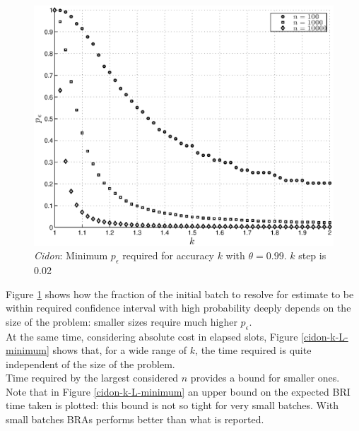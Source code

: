 \documentclass[12pt,a4paper]{report}
\newcommand{\pc}{p_{\epsilon}}
\begin{document}
\begin{figure}[htbp]
\begin{center}
\includegraphics[scale=0.7]{matlab/Cidon/cidon-k-p-minimum}
\caption[\emph{Cidon}: Minimum $\pc$ required for accuracy $k$]{\emph{Cidon}: Minimum $\pc$ required for accuracy $k$ with $\theta=0.99$. $k$ step is 0.02}
\label{cidon-k-p-minimum}
\end{center}
\end{figure}

Figure \ref{cidon-k-p-minimum} shows how the fraction of the initial batch to resolve for estimate to be within  required confidence interval with high probability deeply depends on the size of the problem: smaller sizes require much higher $\pc$.\\
At the same time, considering absolute cost in elapsed slots, Figure  \ref{cidon-k-L-minimum} shows that, for a wide range of $k$, the time required is quite independent of the size of the problem.\\
Time required by the largest considered $n$ provides a  bound for smaller ones.\\
Note that in Figure  \ref{cidon-k-L-minimum} an upper bound on the expected BRI time taken is plotted: this bound is not so tight for very small batches. With small batches BRAs performs better than what is reported.   
\end{document}
